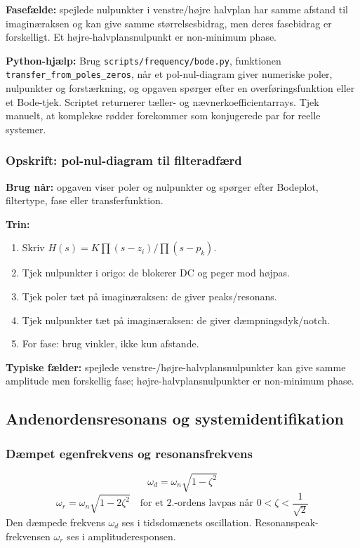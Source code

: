 \textbf{Fasefælde:} spejlede nulpunkter i venstre/højre halvplan har samme afstand til imaginæraksen og kan give samme størrelsesbidrag, men deres fasebidrag er forskelligt. Et højre-halvplansnulpunkt er non-minimum phase.

\textbf{Python-hjælp:} Brug \texttt{scripts/frequency/bode.py}, funktionen \texttt{transfer\_from\_poles\_zeros}, når et pol-nul-diagram giver numeriske poler, nulpunkter og forstærkning, og opgaven spørger efter en overføringsfunktion eller et Bode-tjek. Scriptet returnerer tæller- og nævnerkoefficientarrays. Tjek manuelt, at komplekse rødder forekommer som konjugerede par for reelle systemer.

\subsubsection{Opskrift: pol-nul-diagram til filteradfærd}
\textbf{Brug når:} opgaven viser poler og nulpunkter og spørger efter Bodeplot, filtertype, fase eller transferfunktion.

\textbf{Trin:}
\begin{enumerate}
    \item Skriv \(H(s)=K\prod(s-z_i)/\prod(s-p_k)\).
    \item Tjek nulpunkter i origo: de blokerer DC og peger mod højpas.
    \item Tjek poler tæt på imaginæraksen: de giver peaks/resonans.
    \item Tjek nulpunkter tæt på imaginæraksen: de giver dæmpningsdyk/notch.
    \item For fase: brug vinkler, ikke kun afstande.
\end{enumerate}

\textbf{Typiske fælder:} spejlede venstre-/højre-halvplansnulpunkter kan give samme amplitude men forskellig fase; højre-halvplansnulpunkter er non-minimum phase.

\subsection{Andenordensresonans og systemidentifikation}

\subsubsection{Dæmpet egenfrekvens og resonansfrekvens}
\[
\omega_d=\omega_n\sqrt{1-\zeta^2}
\]
\[
\omega_r=\omega_n\sqrt{1-2\zeta^2}\quad\text{for et 2.-ordens lavpas når }0<\zeta<\frac{1}{\sqrt{2}}
\]
Den dæmpede frekvens \(\omega_d\) ses i tidsdomænets oscillation. Resonanspeak-frekvensen \(\omega_r\) ses i amplituderesponsen.

